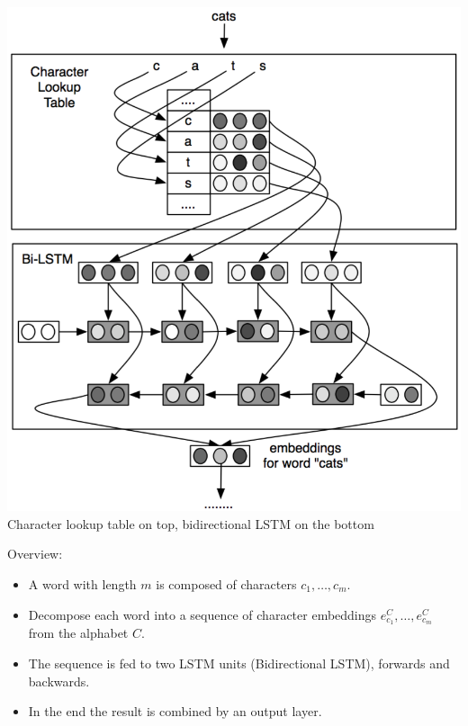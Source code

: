 \documentclass[11pt, a4paper, landscape]{article}
\begin{document}
\vfill
\begin{minipage}[b]{.4\linewidth}
  \begin{center}
    \includegraphics[width=\linewidth]{../article/img/bi-lstm-emeddings}\\
    Character lookup table on top, bidirectional LSTM on the bottom
  \end{center}
\end{minipage}
\begin{minipage}[b]{.6\linewidth}
  Overview:
  \begin{itemize}
  \item A word with length $m$ is composed of characters $c_1, \dots, c_m$.
  \item Decompose each word into a sequence of character embeddings $e_{c_1}^C, \dots, e_{c_m}^C$ from the alphabet $C$.
  \item The sequence is fed to two LSTM units (Bidirectional LSTM), forwards and backwards.
  \item In the end the result is combined by an output layer.
  \end{itemize}
\end{minipage}
\vfill

\NewPage{}
\end{document}

